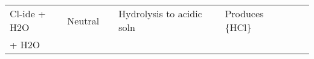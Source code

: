 \documentclass[../main]{subfiles}
\begin{document}
\begin{tabular}{llllllll}
	Cl-ide + H2O   & Neutral                                                                                             &                                                                            & Hydrolysis to acidic soln                                                                     &                                                            & Produces \ch\{HCl\}                                                                                              &                                                                                                                       &     \\
	+ H2O          &                                                                                                     &                                                                            &                                                                                               &                                                            &                                                                                                                  &                                                                                                                       &    
	\end{tabular}
\end{document}
